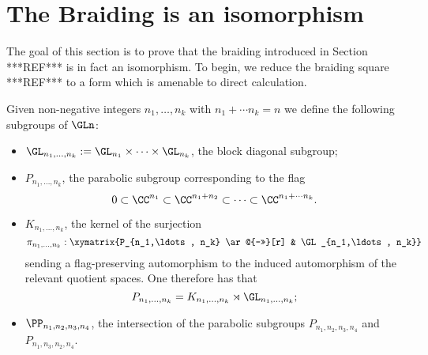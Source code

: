\section{The Braiding is an isomorphism}
\label{BraidingIso}


The goal of this section is to prove that the braiding introduced in Section ***REF*** is in fact an isomorphism. To begin, we reduce the braiding square ***REF*** to a form which is amenable to direct calculation.

Given non-negative integers $n_1, \ldots, n_k$ with $n_1 + \cdots n_k = n$ we define the following subgroups of $\GLn$: 
\begin{itemize}
\item $\GL_{n_1,\ldots,n_k} := \GL_{n_1} \times \cdots \times \GL_{n_k}$, the block diagonal subgroup;
\item  $P_{n_1,\ldots,n_k}$, the parabolic subgroup corresponding to the flag 
\begin{equation*}
    0 \subset \CC^{n_1} \subset \CC^{n_1 + n_2} \subset\cdots \subset \CC^{n_1 + \cdots n_k}.
\end{equation*}
\item $K_{n_1,\ldots, n_k}$, the kernel of the surjection 
\begin{equation*}
\pi_{n_1,\ldots, n_k}:\xymatrix{P_{n_1,\ldots, n_k} \ar@{->>}[r] & \GL_{n_1,\ldots, n_k}}
\end{equation*}
sending a flag-preserving automorphism to the induced automorphism of the relevant quotient spaces. One therefore has that 
\begin{equation*}
    P_{n_1,\ldots, n_k} = K_{n_1,\ldots, n_k} \rtimes \GL_{n_1,\ldots, n_k};
\end{equation*}
 
\item  $\PP_{n_1, n_2, n_3, n_4}$, the intersection of the parabolic subgroups $P_{n_1, n_2, n_3, n_4}$ and $P_{n_1, n_3, n_2, n_4}$.
\end{itemize}

